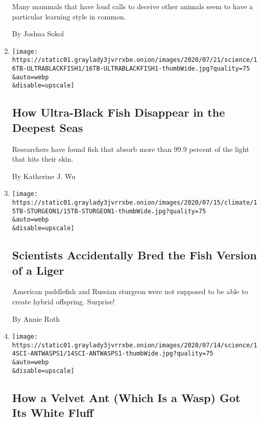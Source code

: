 \begin{enumerate}
  Many mammals that have loud calls to deceive other animals seem to
  have a particular learning style in common.

  By Joshua Sokol
\item
  \href{/2020/07/16/science/ultra-black-fish.html}{}

  \texttt{[image: https://static01.graylady3jvrrxbe.onion/images/2020/07/21/science/16TB-ULTRABLACKFISH1/16TB-ULTRABLACKFISH1-thumbWide.jpg?quality=75\\\&auto=webp\\\&disable=upscale]}

  \hypertarget{how-ultra-black-fish-disappear-in-the-deepest-seas}{%
  \subsection{How Ultra-Black Fish Disappear in the Deepest
  Seas}\label{how-ultra-black-fish-disappear-in-the-deepest-seas}}

  Researchers have found fish that absorb more than 99.9 percent of the
  light that hits their skin.

  By Katherine J. Wu
\item
  \href{/2020/07/15/science/hybrid-sturgeon-paddlefish.html}{}

  \texttt{[image: https://static01.graylady3jvrrxbe.onion/images/2020/07/15/climate/15TB-STURGEON1/15TB-STURGEON1-thumbWide.jpg?quality=75\\\&auto=webp\\\&disable=upscale]}

  \hypertarget{scientists-accidentally-bred-the-fish-version-of-a-liger}{%
  \subsection{Scientists Accidentally Bred the Fish Version of a
  Liger}\label{scientists-accidentally-bred-the-fish-version-of-a-liger}}

  American paddlefish and Russian sturgeon were not supposed to be able
  to create hybrid offspring. Surprise!

  By Annie Roth
\item
  \href{/2020/07/14/science/white-fluffy-ant-wasp.html}{}

  \texttt{[image: https://static01.graylady3jvrrxbe.onion/images/2020/07/14/science/14SCI-ANTWASPS1/14SCI-ANTWASPS1-thumbWide.jpg?quality=75\\\&auto=webp\\\&disable=upscale]}

  \hypertarget{how-a-velvet-ant-which-is-a-wasp-got-its-white-fluff}{%
  \subsection{How a Velvet Ant (Which Is a Wasp) Got Its White
  Fluff}\label{how-a-velvet-ant-which-is-a-wasp-got-its-white-fluff}}


\end{enumerate}
